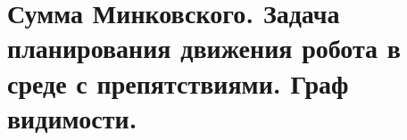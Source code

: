 \section{Сумма Минковского.  Задача планирования движения робота в среде с препятствиями. Граф видимости.}